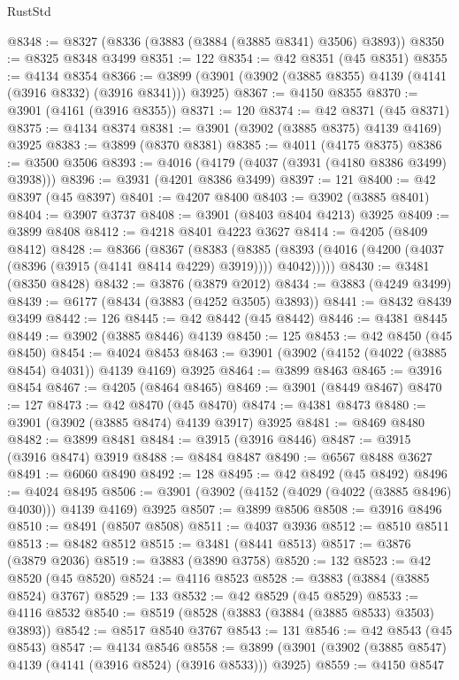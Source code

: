 \begin{lexlean}{RustStd}
\begin{coremodule}
@8348 := @8327 (@8336 (@3883 (@3884 (@3885 @8341) @3506) @3893))
@8350 := @8325 @8348 @3499
@8351 := 122
@8354 := @42 @8351 (@45 @8351)
@8355 := @4134 @8354
@8366 := @3899 (@3901 (@3902 (@3885 @8355) @4139 (@4141 (@3916 @8332) (@3916 @8341))) @3925)
@8367 := @4150 @8355
@8370 := @3901 (@4161 (@3916 @8355))
@8371 := 120
@8374 := @42 @8371 (@45 @8371)
@8375 := @4134 @8374
@8381 := @3901 (@3902 (@3885 @8375) @4139 @4169) @3925
@8383 := @3899 (@8370 @8381)
@8385 := @4011 (@4175 @8375)
@8386 := @3500 @3506
@8393 := @4016 (@4179 (@4037 (@3931 (@4180 @8386 @3499) @3938)))
@8396 := @3931 (@4201 @8386 @3499)
@8397 := 121
@8400 := @42 @8397 (@45 @8397)
@8401 := @4207 @8400
@8403 := @3902 (@3885 @8401)
@8404 := @3907 @3737
@8408 := @3901 (@8403 @8404 @4213) @3925
@8409 := @3899 @8408
@8412 := @4218 @8401 @4223 @3627
@8414 := @4205 (@8409 @8412)
@8428 := @8366
    (@8367
      (@8383
        (@8385 (@8393 (@4016 (@4200 (@4037 (@8396 (@3915 (@4141 @8414 @4229) @3919)))) @4042)))))
@8430 := @3481 (@8350 @8428)
@8432 := @3876 (@3879 @2012)
@8434 := @3883 (@4249 @3499)
@8439 := @6177 (@8434 (@3883 (@4252 @3505) @3893))
@8441 := @8432 @8439 @3499
@8442 := 126
@8445 := @42 @8442 (@45 @8442)
@8446 := @4381 @8445
@8449 := @3902 (@3885 @8446) @4139
@8450 := 125
@8453 := @42 @8450 (@45 @8450)
@8454 := @4024 @8453
@8463 := @3901 (@3902 (@4152 (@4022 (@3885 @8454) @4031)) @4139 @4169) @3925
@8464 := @3899 @8463
@8465 := @3916 @8454
@8467 := @4205 (@8464 @8465)
@8469 := @3901 (@8449 @8467)
@8470 := 127
@8473 := @42 @8470 (@45 @8470)
@8474 := @4381 @8473
@8480 := @3901 (@3902 (@3885 @8474) @4139 @3917) @3925
@8481 := @8469 @8480
@8482 := @3899 @8481
@8484 := @3915 (@3916 @8446)
@8487 := @3915 (@3916 @8474) @3919
@8488 := @8484 @8487
@8490 := @6567 @8488 @3627
@8491 := @6060 @8490
@8492 := 128
@8495 := @42 @8492 (@45 @8492)
@8496 := @4024 @8495
@8506 := @3901 (@3902 (@4152 (@4029 (@4022 (@3885 @8496) @4030))) @4139 @4169) @3925
@8507 := @3899 @8506
@8508 := @3916 @8496
@8510 := @8491 (@8507 @8508)
@8511 := @4037 @3936
@8512 := @8510 @8511
@8513 := @8482 @8512
@8515 := @3481 (@8441 @8513)
@8517 := @3876 (@3879 @2036)
@8519 := @3883 (@3890 @3758)
@8520 := 132
@8523 := @42 @8520 (@45 @8520)
@8524 := @4116 @8523
@8528 := @3883 (@3884 (@3885 @8524) @3767)
@8529 := 133
@8532 := @42 @8529 (@45 @8529)
@8533 := @4116 @8532
@8540 := @8519 (@8528 (@3883 (@3884 (@3885 @8533) @3503) @3893))
@8542 := @8517 @8540 @3767
@8543 := 131
@8546 := @42 @8543 (@45 @8543)
@8547 := @4134 @8546
@8558 := @3899 (@3901 (@3902 (@3885 @8547) @4139 (@4141 (@3916 @8524) (@3916 @8533))) @3925)
@8559 := @4150 @8547

\end{coremodule}
\end{lexlean}
